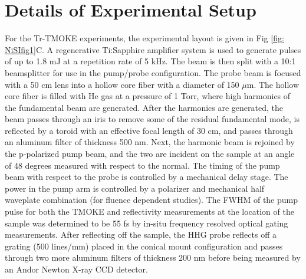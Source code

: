 \section{Details of Experimental Setup}
For the Tr-TMOKE experiments, the experimental layout is given in Fig \ref{fig: NiSIfig1}C. A regenerative Ti:Sapphire amplifier system is used to generate pulses of up to 1.8 mJ at a repetition rate of 5 kHz. The beam is then split with a 10:1 beamsplitter for use in the pump/probe configuration. The probe beam is focused with a 50 cm lens into a hollow core fiber with a diameter of 150 $\mu$m. The hollow core fiber is filled with He gas at a pressure of 1 Torr, where high harmonics of the fundamental beam are generated. After the harmonics are generated, the beam passes through an iris to remove some of the residual fundamental mode, is reflected by a toroid with an effective focal length of 30 cm, and passes through an aluminum filter of thickness 500 nm. Next, the harmonic beam is rejoined by the p-polarized pump beam, and the two are incident on the sample at an angle of 48 degrees measured with respect to the normal. The timing of the pump beam with respect to the probe is controlled by a mechanical delay stage. The power in the pump arm is controlled by a polarizer and mechanical half waveplate combination (for fluence dependent studies). The FWHM of the pump pulse for both the TMOKE and reflectivity measurements at the location of the sample was determined to be 55 fs by in-situ frequency resolved optical gating measurements. After reflecting off the sample, the HHG probe reflects off a grating (500 lines/mm) placed in the conical mount configuration and passes through two more aluminum filters of thickness 200 nm before being measured by an Andor Newton X-ray CCD detector.